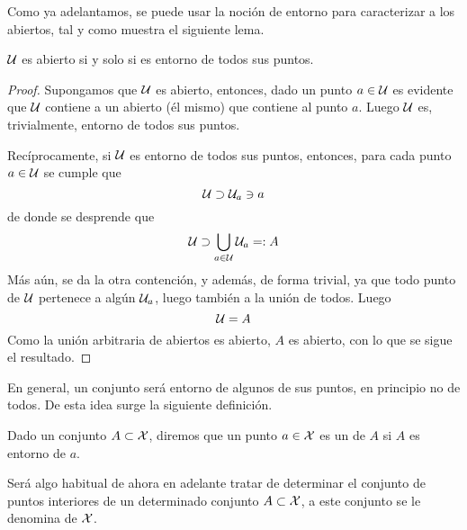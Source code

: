 Como ya adelantamos, se puede usar la noción de entorno para caracterizar a los abiertos, tal y como muestra el siguiente lema.
\begin{lem}
	\label{etop_lem_caracterizacionAbiertos}
	$\mathcal{U}$ es abierto si y solo si es entorno de todos sus puntos.
\end{lem}
\begin{proof}
	Supongamos que $\mathcal{U}$ es abierto, entonces, dado un punto $a\in\mathcal{U}$ es evidente que $\mathcal{U}$ contiene a un abierto (él mismo) que contiene al punto $a$. Luego $\mathcal{U}$ es, trivialmente, entorno de todos sus puntos.
	
	Recíprocamente, si $\mathcal{U}$ es entorno de todos sus puntos, entonces, para cada punto $a\in\mathcal{U}$ se cumple que
	\begin{equation*}
		\mathcal{U}\supset\mathcal{U}_a\ni a
	\end{equation*}
	de donde se desprende que
	\begin{equation*}
		\mathcal{U}\supset\bigcup_{a\in\mathcal{U}}\mathcal{U}_a=:A
	\end{equation*}
	Más aún, se da la otra contención, y además, de forma trivial, ya que todo punto de $\mathcal{U}$ pertenece a algún $\mathcal{U}_a$, luego también a la unión de todos. Luego
	\begin{equation*}
		\mathcal{U}=A
	\end{equation*}
	Como la unión arbitraria de abiertos es abierto, $A$ es abierto, con lo que se sigue el resultado.
\end{proof}
En general, un conjunto será entorno de algunos de sus puntos, en principio no de todos. De esta idea surge la siguiente definición.
\begin{defi}
	\label{etop_def_puntoInterior}
	Dado un conjunto $A\subset\mathcal{X}$, diremos que un punto $a\in\mathcal{X}$ es un  de $A$ si $A$ es entorno de $a$.
\end{defi}
Será algo habitual de ahora en adelante tratar de determinar el conjunto de puntos interiores de un determinado conjunto $A\subset\mathcal{X}$, a este conjunto se le denomina  de $\mathcal{X}$.

